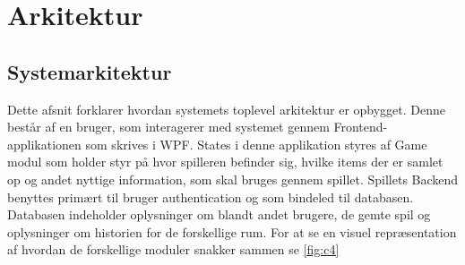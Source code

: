 \section{Arkitektur}

\subsection{Systemarkitektur}
\noindent
Dette afsnit forklarer hvordan systemets toplevel arkitektur er opbygget.
Denne består af en bruger, som interagerer med systemet gennem Frontend-applikationen som skrives i WPF. 
States i denne applikation styres af Game modul som holder styr på hvor spilleren befinder sig, hvilke items der er samlet op og andet nyttige information, som skal bruges gennem spillet.
Spillets Backend benyttes primært til bruger authentication og som bindeled til databasen.
Databasen indeholder oplysninger om blandt andet brugere, de gemte spil og oplysninger om historien for de forskellige rum.
For at se en visuel repræsentation af hvordan de forskellige moduler snakker sammen se \autoref{fig:c4}











